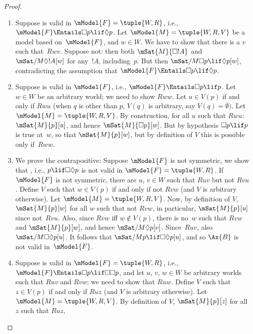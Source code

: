 \documentclass[../../../include/open-logic-section]{subfiles}
\begin{document}
\begin{proof}
  \begin{enumerate}
  \item Suppose  is valid in $\mModel{F} = \tuple{W, R}$, i.e.,
    $\mModel{F} \Entails \Box p \lif \Diamond p$. Let $\mModel{M} =
    \tuple{W, R, V}$ be a model based on~$\mModel{F}$, and $w \in
    W$. We have to show that there is a $v$ such that~$Rwv$.  Suppose
    not: then both $\mSat{M}{\Box !A}$ and $\mSat/{M}{\Diamond !A}[w]$
    for any~$!A$, including~$p$. But then $\mSat/{M}{\Box p \lif
      \Diamond p}[w]$, contradicting the assumption that $\mModel{F}
    \Entails \Box p \lif \Diamond p$.
  \item Suppose  is valid in $\mModel{F}$, i.e., $\mModel{F} \Entails \Box
    p \lif p$. Let $w \in W$ be an arbitrary world; we need to show
    $Rww$. Let $u \in V(p)$ if and only if $Rwu$ (when $q$ is other
    than $p$, $V(q)$ is arbitrary, say $V(q) = \emptyset)$. Let
    $\mModel{M} = \tuple{W, R, V}$. By construction, for all $u$ such
    that $Rwu$: $\mSat{M}{p}[u]$, and hence $\mSat{M}{\Box p}[w]$. But
    by hypothesis $\Box p \lif p$ is true at~$w$, so that
    $\mSat{M}{p}[w]$, but by definition of $V$ this is possible only
    if~$Rww$.
  \item We prove the contrapositive: Suppose $\mModel{F}$ is not
    symmetric, we show that , i.e., $p \lif \Box\Diamond p$ is
    not valid in $\mModel{F}= \tuple{W, R}$. If $\mModel{F}$ is not
    symmetric, there are $u$, $v \in W$ such that $Ruv$ but not
    $Rvu$. Define $V$ such that $w \in V(p)$ if and only if not $Rvw$
    (and $V$ is arbitrary otherwise). Let $\mModel{M} =\tuple{W, R,
      V}$.  Now, by definition of $V$, $\mSat{M}{p}[w]$ for all $w$
    such that not $Rvw$, in particular, $\mSat{M}{p}[u]$ since
    not~$Rvu$. Also, since $Rvw$ iff $w \notin V(p)$, there is no~$w$
    such that $Rvw$ and $\mSat{M}{p}[w]$, and hence
    $\mSat/{M}{\Diamond p}[v]$. Since~$Ruv$, also
    $\mSat/{M}{\Box\Diamond p}[u]$. It follows that $\mSat/{M}{p \lif
      \Box\Diamond p}[u]$, and so $\Ax{B}$ is not valid
    in~$\mModel{F}$.
  \item Suppose  is valid in $\mModel{F} = \tuple{W,R}$, i.e.,
    $\mModel{F} \Entails \Box p \lif \Box\Box p$, and let $u$, $v$, $w \in W$ be
    arbitrary worlds such that $Ruv$ and $Rvw$; we need to show that
    $Ruw$. Define $V$ such that $z \in V(p)$ if and only if $Ruz$ (and
    $V$ is arbitrary otherwise). Let $\mModel{M} =\tuple{W, R, V}$. By
    definition of $V$, $\mSat{M}{p}[z]$ for all $z$ such that $Ruz$,

\end{enumerate}
\end{proof}
\end{document}

